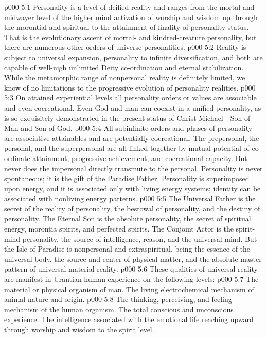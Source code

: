 \vs p000 5:1 Personality is a level of deified reality and ranges from the mortal and midwayer level of the higher mind activation of worship and wisdom up through the morontial and spiritual to the attainment of finality of personality status. That is the evolutionary ascent of mortal\hyp{} and kindred\hyp{}creature personality, but there are numerous other orders of universe personalities.
\vs p000 5:2 Reality is subject to universal expansion, personality to infinite diversification, and both are capable of well\hyp{}nigh unlimited Deity co\hyp{}ordination and eternal stabilization. While the metamorphic range of nonpersonal reality is definitely limited, we know of no limitations to the progressive evolution of personality realities.
\vs p000 5:3 On attained experiential levels all personality orders or values are associable and even cocreational. Even God and man can coexist in a unified personality, as is so exquisitely demonstrated in the present status of Christ Michael---Son of Man and Son of God.
\vs p000 5:4 All subinfinite orders and phases of personality are associative attainables and are potentially cocreational. The prepersonal, the personal, and the superpersonal are all linked together by mutual potential of co\hyp{}ordinate attainment, progressive achievement, and cocreational capacity. But never does the impersonal directly transmute to the personal. Personality is never spontaneous; it is the gift of the Paradise Father. Personality is superimposed upon energy, and it is associated only with living energy systems; identity can be associated with nonliving energy patterns.
\pc \vs p000 5:5 The Universal Father is the secret of the reality of personality, the bestowal of personality, and the destiny of personality. The Eternal Son is the absolute personality, the secret of spiritual energy, morontia spirits, and perfected spirits. The Conjoint Actor is the spirit\hyp{}mind personality, the source of intelligence, reason, and the universal mind. But the Isle of Paradise is nonpersonal and extraspiritual, being the essence of the universal body, the source and center of physical matter, and the absolute master pattern of universal material reality.
\pc \vs p000 5:6 These qualities of universal reality are manifest in Urantian human experience on the following levels:
\pc \vs p000 5:7 \bibnobreakspace {} The material or physical organism of man. The living electrochemical mechanism of animal nature and origin.
\vs p000 5:8 \bibnobreakspace {} The thinking, perceiving, and feeling mechanism of the human organism. The total conscious and unconscious experience. The intelligence associated with the emotional life reaching upward through worship and wisdom to the spirit level.

